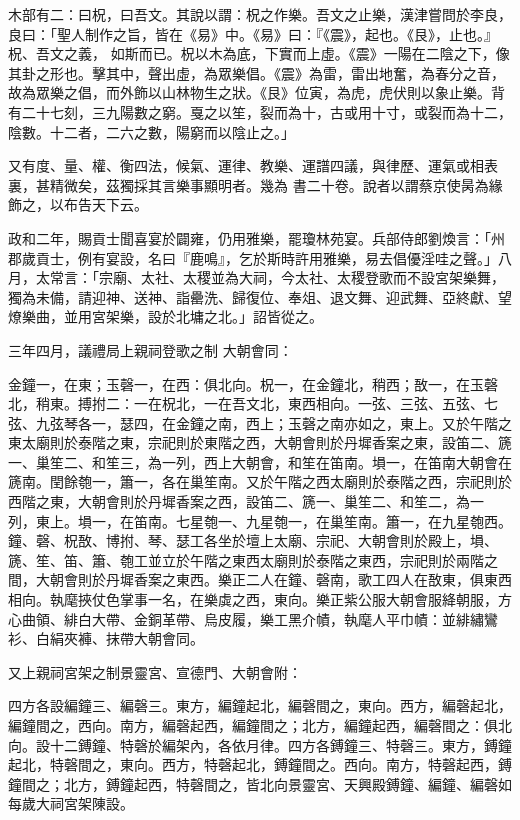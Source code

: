 \begin{pinyinscope}
 木部有二：曰柷，曰吾文。其說以謂：柷之作樂。吾文之止樂，漢津嘗問於李良，良曰：「聖人制作之旨，皆在《易》中。《易》曰：『《震》，起也。《艮》，止也。』柷、吾文之義，
 如斯而已。柷以木為底，下實而上虛。《震》一陽在二陰之下，像其卦之形也。擊其中，聲出虛，為眾樂倡。《震》為雷，雷出地奮，為春分之音，故為眾樂之倡，而外飾以山林物生之狀。《艮》位寅，為虎，虎伏則以象止樂。背有二十七刻，三九陽數之窮。戛之以笙，裂而為十，古或用十寸，或裂而為十二，陰數。十二者，二六之數，陽窮而以陰止之。」



 又有度、量、權、衡四法，候氣、運律、教樂、運譜四議，與律歷、運氣或相表裏，甚精微矣，茲獨採其言樂事顯明者。幾為
 書二十卷。說者以謂蔡京使昺為緣飾之，以布告天下云。



 政和二年，賜貢士聞喜宴於闢雍，仍用雅樂，罷瓊林苑宴。兵部侍郎劉煥言：「州郡歲貢士，例有宴設，名曰『鹿鳴』，乞於斯時許用雅樂，易去倡優淫哇之聲。」八月，太常言：「宗廟、太社、太稷並為大祠，今太社、太稷登歌而不設宮架樂舞，獨為未備，請迎神、送神、詣罍洗、歸復位、奉俎、退文舞、迎武舞、亞終獻、望燎樂曲，並用宮架樂，設於北墉之北。」詔皆從之。



 三年四月，議禮局上親祠登歌之制
 大朝會同：



 金鐘一，在東；玉磬一，在西：俱北向。柷一，在金鐘北，稍西；敔一，在玉磬北，稍東。搏拊二：一在柷北，一在吾文北，東西相向。一弦、三弦、五弦、七弦、九弦琴各一，瑟四，在金鐘之南，西上；玉磬之南亦如之，東上。又於午階之東太廟則於泰階之東，宗祀則於東階之西，大朝會則於丹墀香案之東，設笛二、篪一、巢笙二、和笙三，為一列，西上大朝會，和笙在笛南。塤一，在笛南大朝會在篪南。閏餘匏一，簫一，各在巢笙南。又於午階之西太廟則於泰階之西，宗祀則於西階之東，大朝會則於丹墀香案之西，設笛二、篪一、巢笙二、和笙二，為一
 列，東上。塤一，在笛南。七星匏一、九星匏一，在巢笙南。簫一，在九星匏西。鐘、磬、柷敔、博拊、琴、瑟工各坐於壇上太廟、宗祀、大朝會則於殿上，塤、篪、笙、笛、簫、匏工並立於午階之東西太廟則於泰階之東西，宗祀則於兩階之間，大朝會則於丹墀香案之東西。樂正二人在鐘、磬南，歌工四人在敔東，俱東西相向。執麾挾仗色掌事一名，在樂虡之西，東向。樂正紫公服大朝會服絳朝服，方心曲領、緋白大帶、金銅革帶、烏皮履，樂工黑介幘，執麾人平巾幘：並緋繡鸞衫、白絹夾褲、抹帶大朝會同。



 又上親祠宮架之制景靈宮、宣德門、大朝會附：



 四方各設編鐘三、編磬三。東方，編鐘起北，編磬間之，東向。西方，編磬起北，編鐘間之，西向。南方，編磬起西，編鐘間之；北方，編鐘起西，編磬間之：俱北向。設十二鎛鐘、特磬於編架內，各依月律。四方各鎛鐘三、特磬三。東方，鎛鐘起北，特磬間之，東向。西方，特磬起北，鎛鐘間之。西向。南方，特磬起西，鎛鐘間之；北方，鎛鐘起西，特磬間之，皆北向景靈宮、天興殿鎛鐘、編鐘、編磬如每歲大祠宮架陳設。




\end{pinyinscope}
